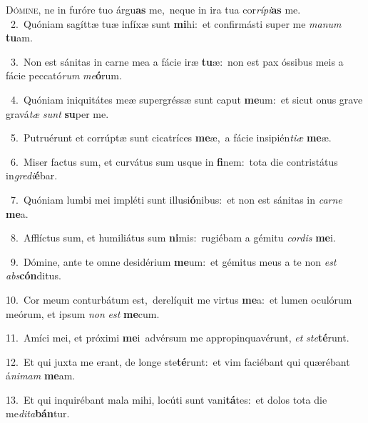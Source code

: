 \lettrine{\initial\textcolor{\initialcolor}{D}}{ómine,} ne in furóre tuo árgu\textbf{as} me,~\star neque in ira tua cor\-\textit{rí}\-\textit{pi}\textbf{as} me.\\
{\numbfont\textcolor{\numbcolor}{~2.}}~Quóniam sagíttæ tuæ infíxæ sunt \textbf{mi}\-hi:~\star et confirmásti super me \textit{ma}\-\textit{num} \textbf{tu}\-am.\par
{\numbfont\textcolor{\numbcolor}{~3.}}~Non est sánitas in carne mea a fácie iræ \textbf{tu}\-æ:~\star non est pax óssibus meis a fácie peccató\textit{rum} \textit{me}\-\textbf{ó}rum.\par
{\numbfont\textcolor{\numbcolor}{~4.}}~Quóniam iniquitátes meæ supergréssæ sunt caput \textbf{me}\-um:~\star et sicut onus grave gravá\textit{tæ} \textit{sunt} \textbf{su}\-per me.\par
{\numbfont\textcolor{\numbcolor}{~5.}}~Putruérunt et corrúptæ sunt cicatríces \textbf{me}\-æ,~\star a fácie insipién\-\textit{ti}\-\textit{æ} \textbf{me}\-æ.\par
{\numbfont\textcolor{\numbcolor}{~6.}}~Miser factus sum, et curvátus sum usque in \textbf{fi}\-nem:~\star tota die contristátus in\-\textit{gre}\-\textit{di}\textbf{é}bar.\par
{\numbfont\textcolor{\numbcolor}{~7.}}~Quóniam lumbi mei impléti sunt illusi\-\textbf{ó}\-nibus:~\star et non est sánitas in \textit{car}\-\textit{ne} \textbf{me}\-a.\par
{\numbfont\textcolor{\numbcolor}{~8.}}~Afflíctus sum, et humiliátus sum \textbf{ni}\-mis:~\star rugiébam a gémitu \textit{cor}\-\textit{dis} \textbf{me}\-i.\par
{\numbfont\textcolor{\numbcolor}{~9.}}~Dómine, ante te omne desidérium \textbf{me}\-um:~\star et gémitus meus a te non \textit{est} \textit{abs}\-\textbf{cón}ditus.\par
{\numbfont\textcolor{\numbcolor}{10.}}~Cor meum conturbátum est,~\dagger derelíquit me virtus \textbf{me}\-a:~\star et lumen oculórum meórum, et ipsum \textit{non} \textit{est} \textbf{me}\-cum.\par
{\numbfont\textcolor{\numbcolor}{11.}}~Amíci mei, et próximi \textbf{me}\-i~\star advérsum me appropinquavérunt, \textit{et} \textit{ste}\-\textbf{té}runt.\par
{\numbfont\textcolor{\numbcolor}{12.}}~Et qui juxta me erant, de longe ste\-\textbf{té}\-runt:~\star et vim faciébant qui quærébant á\-\textit{ni}\-\textit{mam} \textbf{me}\-am.\par
{\numbfont\textcolor{\numbcolor}{13.}}~Et qui inquirébant mala mihi, locúti sunt vani\-\textbf{tá}\-tes:~\star et dolos tota die me\-\textit{di}\-\textit{ta}\textbf{bán}tur.\par
